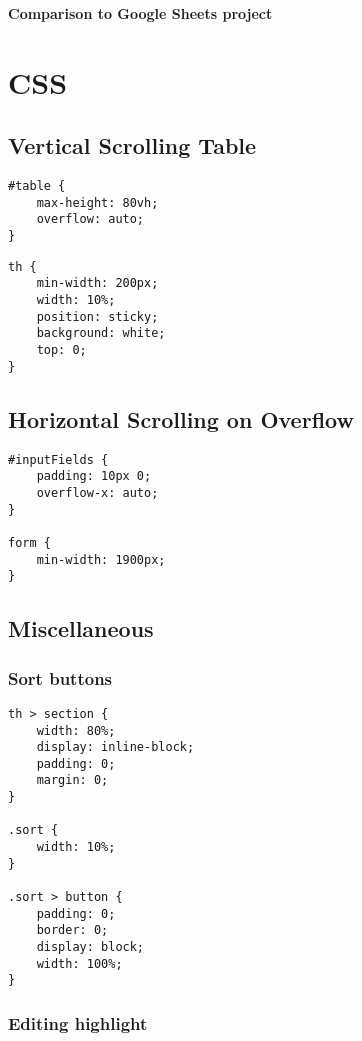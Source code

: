 \documentclass[letterpaper]{article}
\begin{document}
\textbf{Comparison to Google Sheets project}

\newpage

\section{CSS}\label{CSS}

\subsection{Vertical Scrolling Table}

\begin{lstlisting}[firstnumber=29]
#table {
    max-height: 80vh;
    overflow: auto;
}
\end{lstlisting}

\begin{lstlisting}[firstnumber=39]
th {
    min-width: 200px;
    width: 10%;
    position: sticky;
    background: white;
    top: 0;
}
\end{lstlisting}

\subsection{Horizontal Scrolling on Overflow}\label{overflow-x}

\begin{lstlisting}[firstnumber=5]
#inputFields {
    padding: 10px 0;
    overflow-x: auto;
}

form {
    min-width: 1900px;
}
\end{lstlisting}

\subsection{Miscellaneous}

\subsubsection{Sort buttons}

\begin{lstlisting}[firstnumber=47]
th > section {
    width: 80%;
    display: inline-block;
    padding: 0;
    margin: 0;
}

.sort {
    width: 10%;
}

.sort > button {
    padding: 0;
    border: 0;
    display: block;
    width: 100%;
}
\end{lstlisting}

\subsubsection{Editing highlight}
\end{document}
